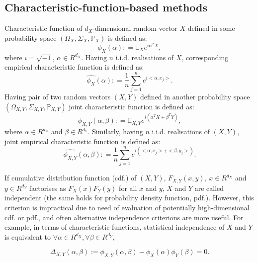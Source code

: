 \documentclass{article}
\begin{document}
\subsection{Characteristic-function-based methods}
\label{section:previous_work_cf}
Characteristic function of $d_{X}$-dimensional random vector $X$ defined in some probability space $(\Omega_{X}, \Sigma_{X}, \mathbb{P}_{X})$ is defined as: 
\begin{equation}
    \label{eq:characteristic_function}
    \phi_{X}(\alpha): = \mathbb{E}_{X} e^{i\alpha^{T}X}, 
\end{equation}
where $i=\sqrt{-1}$, $\alpha \in R^{d_{X}}$. Having $n$ i.i.d. realisations of $X$, corresponding empirical characteristic function is defined as:
\begin{equation}
    \label{eq:ecf}
  \widehat{\phi_{X}}(\alpha): = \frac{1}{n} \sum_{j=1}^{n} e^{i <\alpha, x_{j}>}.
\end{equation}
Having pair of two random vectors $(X,Y)$ defined in another probability space $(\Omega_{X,Y}, \Sigma_{X,Y}, \mathbb{P}_{X,Y})$  joint characteristic function is defined as:
\begin{equation}
    \label{eq:joint_characteristic_function}
    \phi_{X,Y}(\alpha,\beta): = \mathbb{E}_{X,Y} e^{i(\alpha^{T}X + \beta^{T}Y)},
\end{equation}
where $\alpha \in R^{d_{X}}$ and $\beta \in R^{d_{Y}}$. Similarly, having 
$n$ i.i.d. realisations of $(X,Y)$, joint empirical characteristic function is defined as:
\begin{equation}
    \label{eq:joint_ecf}
\widehat{\phi_{X,Y}}(\alpha,\beta): = \frac{1}{n} \sum_{j=1}^{n} e^{i(<\alpha, x_{j}> + <\beta, y_{j}>) }.
\end{equation}

If cumulative distribution function (cdf.) of $(X,Y)$, $F_{X,Y}(x,y)$, $x \in R^{d_{X}}$ and $y \in R^{d_{Y}}$ factorises as $F_{X}(x)F_{Y}(y)$ for all $x$ and $y$, $X$ and $Y$ are called independent (the same holds for probability density function, pdf.). However, this criterion is impractical due to need of evaluation of potentially high-dimensional cdf. or pdf., and often alternative independence criterions are more useful. For example, in terms of characteristic functions, statistical independence  of $X$ and $Y$ is equivalent to $\forall \alpha \in R^{d_X},\forall \beta \in R^{d_Y} $, 

\begin{equation}
\label{eq:kac_theorem}
\Delta_{X,Y}(\alpha, \beta) := \phi_{X,Y}(\alpha,\beta) - \phi_{X}(\alpha) \phi_{Y}(\beta) = 0.
\end{equation}
\end{document}
